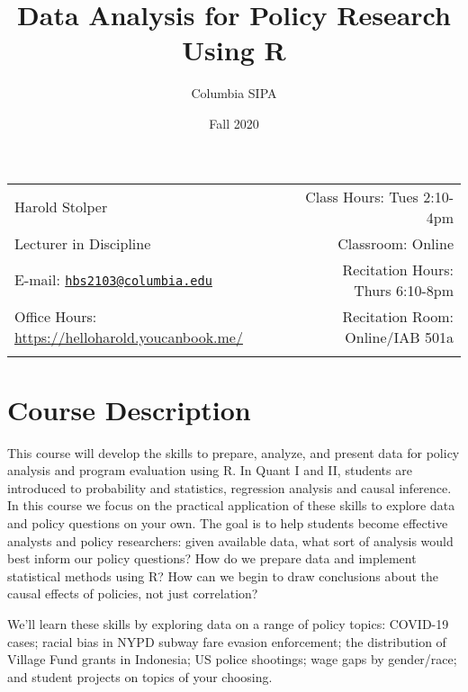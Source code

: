 \documentclass[11pt,]{article}
\title{Data Analysis for Policy Research Using R}
\author{Columbia \textbar{} SIPA}
\date{Fall 2020}
\begin{document}
  

		\maketitle
		
	
		\thispagestyle{firststyle}



	\noindent \begin{tabular*}{\textwidth}{ @{\extracolsep{\fill}} lr @{\extracolsep{\fill}}}

Harold Stolper & Class Hours: Tues 2:10-4pm\\
Lecturer in Discipline & Classroom: Online\\
E-mail: \texttt{\href{mailto:hbs2103@columbia.edu}{\nolinkurl{hbs2103@columbia.edu}}} & Recitation Hours: Thurs
6:10-8pm\\
Office Hours: \url{https://helloharold.youcanbook.me/}  &  Recitation Room: Online/IAB
501a\\
	&  \\
	\hline
	\end{tabular*}
	
\vspace{2mm}
	


\hypertarget{course-description}{%
\section{Course Description}\label{course-description}}

This course will develop the skills to prepare, analyze, and present
data for policy analysis and program evaluation using R. In Quant I and
II, students are introduced to probability and statistics, regression
analysis and causal inference. In this course we focus on the practical
application of these skills to explore data and policy questions on your
own. The goal is to help students become effective analysts and policy
researchers: given available data, what sort of analysis would best
inform our policy questions? How do we prepare data and implement
statistical methods using R? How can we begin to draw conclusions about
the causal effects of policies, not just correlation?

We'll learn these skills by exploring data on a range of policy topics:
COVID-19 cases; racial bias in NYPD subway fare evasion enforcement; the
distribution of Village Fund grants in Indonesia; US police shootings;
wage gaps by gender/race; and student projects on topics of your
choosing.
\end{document}
